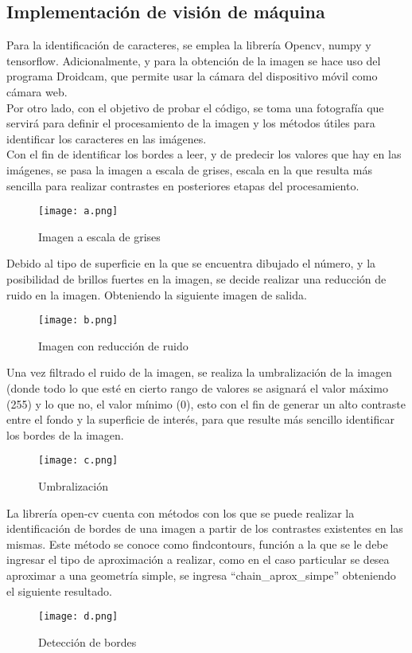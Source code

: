 \documentclass[journal]{IEEEtran}
\begin{document}
\subsection{Implementación de visión de máquina}
Para la identificación de caracteres, se emplea la librería Opencv, numpy y tensorflow. Adicionalmente, y para la obtención de la imagen se hace uso del programa Droidcam, que permite usar la cámara del dispositivo móvil como cámara web.\\
Por otro lado, con el objetivo de probar el código, se toma una fotografía que servirá para definir el procesamiento de la imagen y los métodos útiles para identificar los caracteres en las imágenes.\\
Con el fin de identificar los bordes a leer, y de predecir los valores que hay en las imágenes, se pasa la imagen a escala de grises, escala en la que resulta más sencilla para realizar contrastes en posteriores etapas del procesamiento.\\
 \begin{figure} [H]
    \centering
    \texttt{[image: a.png]}
    \caption{Imagen a escala de grises}
    \label{a}
\end{figure}


Debido al tipo de superficie en la que se encuentra dibujado el número, y la posibilidad de brillos fuertes en la imagen, se decide realizar una reducción de ruido en la imagen. Obteniendo la siguiente imagen de salida.\\
\begin{figure} [H]
    \centering
    \texttt{[image: b.png]}
    \caption{Imagen con reducción de ruido}
    \label{b}
\end{figure}
 
Una vez filtrado el ruido de la imagen, se realiza la umbralización de la imagen (donde todo lo que esté en cierto rango de valores se asignará el valor máximo (255) y lo que no, el valor mínimo (0), esto con el fin de generar un alto contraste entre el fondo y la superficie de interés, para que resulte más sencillo identificar los bordes de la imagen.\\
\begin{figure} [H]
    \centering
    \texttt{[image: c.png]}
    \caption{Umbralización}
    \label{c}
\end{figure}
 
La librería open-cv cuenta con métodos con los que se puede realizar la identificación de bordes de una imagen a partir de los contrastes existentes en las mismas.  Este método se conoce como findcontours, función a la que se le debe ingresar el tipo de aproximación a realizar, como en el caso particular se desea aproximar a una geometría simple, se ingresa “chain\_aprox\_simpe” obteniendo el siguiente resultado.\\
\begin{figure} [H]
    \centering
    \texttt{[image: d.png]}
    \caption{Detección de bordes}
    \label{d}
\end{figure}
 
\end{document}
